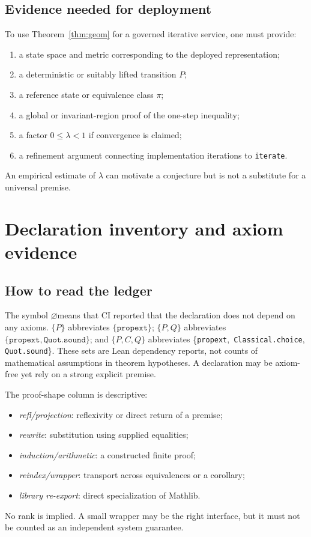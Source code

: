 \documentclass[10pt,letterpaper]{article}
\theoremstyle{definition}
\newcommand{\coretrio}{\{\texttt{propext},\,\allowbreak
  \texttt{Classical.choice},\,\allowbreak\texttt{Quot.sound}\}}
\newcommand{\none}{\(\varnothing\)}
\begin{document}
\subsection{Evidence needed for deployment}
To use Theorem~\ref{thm:geom} for a governed iterative service, one must provide:
\begin{enumerate}
\item a state space and metric corresponding to the deployed representation;
\item a deterministic or suitably lifted transition \(P\);
\item a reference state or equivalence class \(\pi\);
\item a global or invariant-region proof of the one-step inequality;
\item a factor \(0\leq\lambda<1\) if convergence is claimed;
\item a refinement argument connecting implementation iterations to
  \texttt{iterate}.
\end{enumerate}
An empirical estimate of \(\lambda\) can motivate a conjecture but is not a
substitute for a universal premise.

\section{Declaration inventory and axiom evidence}\label{sec:inventory}
\subsection{How to read the ledger}
The symbol \none means that CI reported that the declaration does not depend on
any axioms. \(\{P\}\) abbreviates \(\{\texttt{propext}\}\);
\(\{P,Q\}\) abbreviates
\(\{\texttt{propext},\texttt{Quot.sound}\}\); and
\(\{P,C,Q\}\) abbreviates \coretrio. These sets are Lean dependency reports,
not counts of mathematical assumptions in theorem hypotheses. A declaration
may be axiom-free yet rely on a strong explicit premise.

The proof-shape column is descriptive:
\begin{itemize}
\item \emph{refl/projection}: reflexivity or direct return of a premise;
\item \emph{rewrite}: substitution using supplied equalities;
\item \emph{induction/arithmetic}: a constructed finite proof;
\item \emph{reindex/wrapper}: transport across equivalences or a corollary;
\item \emph{library re-export}: direct specialization of Mathlib.
\end{itemize}
No rank is implied. A small wrapper may be the right interface, but it must not
be counted as an independent system guarantee.
\end{document}
